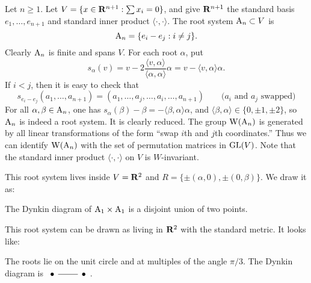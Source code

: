 \begin{example}
Let $n\geqslant 1$. Let $V=\{x\in \mathbf{R}^{n+1}:\sum x_i=0\}$, and give $\mathbf{R}^{n+1}$ 
the standard basis $e_1,\dots,e_{n+1}$ and standard inner product 
$\langle\cdot,\cdot\rangle$. The root system $\mathrm{A}_n\subset V$ is 
\[
  \mathrm{A}_n=\{e_i-e_j:i\ne j\} .
\]
Clearly $\mathrm{A}_n$ is finite and spans $V$. For each root $\alpha$, put 
\[
  s_\alpha(v) = v-2\frac{\langle v,\alpha\rangle}{\langle \alpha,\alpha\rangle} \alpha  = v-\langle v,\alpha\rangle \alpha .
\]
If $i<j$, then it is easy to check that 
\[
  s_{e_i-e_j}(a_1,\dots,a_{n+1}) = (a_1,\dots,a_j,\dots,a_i,\dots,a_{n+1}) \qquad \text{($a_i$ and $a_j$ swapped)}
\]
For all $\alpha,\beta\in \mathrm{A}_n$, one has 
$s_\alpha(\beta)-\beta=-\langle \beta,\alpha\rangle\alpha$, and 
$\langle \beta,\alpha\rangle\in \{0,\pm 1,\pm 2\}$, so $\mathrm{A}_n$ is indeed 
a root system. It is clearly reduced. The group $\operatorname{W}(\mathrm{A}_n)$ is generated 
by all linear transformations of the form ``swap $i$th and $j$th coordinates.'' 
Thus we can identify $\operatorname{W}(\mathrm{A}_n)$ with the set of permutation matrices 
in $\operatorname{GL}(V)$. Note that the standard inner product $\langle\cdot,\cdot\rangle$ 
on $V$ is $W$-invariant. 
\end{example}

\begin{example}
This root system lives inside $V=\mathbf{R}^2$ and 
$R=\{\pm (\alpha,0),\pm (0,\beta)\}$. We draw it as: 
\begin{center}
\end{center}
The Dynkin diagram of $\mathrm{A}_1\times \mathrm{A}_1$ is a disjoint union of 
two points. 
\end{example}


\begin{example}
This root system can be drawn as living in $\mathbf{R}^2$ with the standard metric. It 
looks like:
\begin{center}
\end{center}
The roots lie on the unit circle and at multiples of the angle $\pi/3$. 
The Dynkin diagram is 
$\begin{tikzcd} \bullet \ar[r, dash] & \bullet \end{tikzcd}$. 
\end{example}

